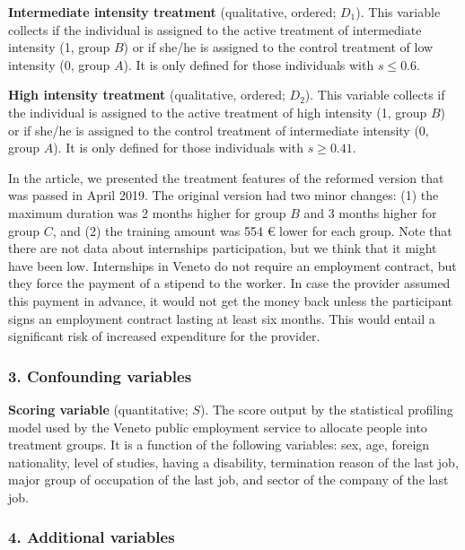 \documentclass[
  11pt]{article}
\begin{document}
\textbf{Intermediate intensity treatment} (qualitative, ordered;
\(D_1\)). This variable collects if the individual is assigned to the
active treatment of intermediate intensity (1, group \(B\)) or if she/he
is assigned to the control treatment of low intensity (0, group \(A\)).
It is only defined for those individuals with \(s \le 0.6\).

\textbf{High intensity treatment} (qualitative, ordered; \(D_2\)). This
variable collects if the individual is assigned to the active treatment
of high intensity (1, group \(B\)) or if she/he is assigned to the
control treatment of intermediate intensity (0, group \(A\)). It is only
defined for those individuals with \(s \ge 0.41\).

In the article, we presented the treatment features of the reformed
version that was passed in April 2019. The original version had two
minor changes: (1) the maximum duration was 2 months higher for group
\(B\) and 3 months higher for group \(C\), and (2) the training amount
was 554 € lower for each group. Note that there are not data about
internships participation, but we think that it might have been low.
Internships in Veneto do not require an employment contract, but they
force the payment of a stipend to the worker. In case the provider
assumed this payment in advance, it would not get the money back unless
the participant signs an employment contract lasting at least six
months. This would entail a significant risk of increased expenditure
for the provider.

\subsubsection*{3. Confounding variables}\label{confounding-variables}

\textbf{Scoring variable} (quantitative; \(S\)). The score output by the
statistical profiling model used by the Veneto public employment service
to allocate people into treatment groups. It is a function of the
following variables: sex, age, foreign nationality, level of studies,
having a disability, termination reason of the last job, major group of
occupation of the last job, and sector of the company of the last job.

\subsubsection*{4. Additional variables}\label{additional-variables}
\end{document}
